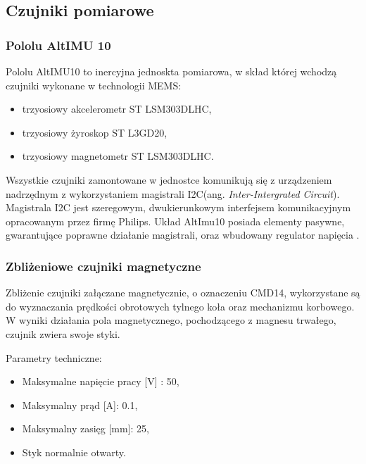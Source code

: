 \subsection{Czujniki pomiarowe}
\subsubsection{Pololu AltIMU 10}

Pololu AltIMU10 to inercyjna jednoskta pomiarowa, w skład której wchodzą czujniki wykonane w technologii MEMS:
\begin{itemize}
\item
trzyosiowy akcelerometr ST LSM303DLHC,
\item
trzyosiowy żyroskop ST L3GD20,
\item
trzyosiowy magnetometr ST LSM303DLHC.
\end{itemize}

Wszystkie czujniki zamontowane w jednostce komunikują się z urządzeniem nadrzędnym z wykorzystaniem magistrali I2C(ang. {\em Inter-Intergrated Circuit}). Magistrala I2C jest szeregowym, dwukierunkowym interfejsem komunikacyjnym opracowanym przez firmę Philips. Układ AltImu10 posiada elementy pasywne, gwarantujące poprawne działanie magistrali, oraz wbudowany regulator napięcia \cite{Pololu}.
\subsubsection{Zbliżeniowe czujniki magnetyczne}
Zbliżenie czujniki załączane magnetycznie, o oznaczeniu CMD14, wykorzystane są do wyznaczania prędkości obrotowych tylnego koła oraz mechanizmu korbowego. W wyniki działania pola magnetycznego, pochodzącego z magnesu trwałego, czujnik zwiera swoje styki. 
 
Parametry techniczne:
\begin{itemize}
\item
Maksymalne napięcie pracy [V] : 50,
\item
Maksymalny prąd [A]: 0.1,
\item
Maksymalny zasięg [mm]: 25,
\item
Styk normalnie otwarty.
\end{itemize}
